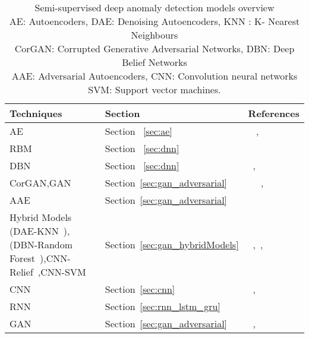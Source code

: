 \begin{table*}
\begin{center}
\caption{Semi-supervised deep anomaly detection models overview
        \\AE: Autoencoders, DAE: Denoising Autoencoders, KNN : K- Nearest Neighbours
        \\CorGAN: Corrupted Generative Adversarial Networks, DBN: Deep Belief Networks
        \\ AAE: Adversarial Autoencoders, CNN: Convolution neural networks
        \\ SVM:  Support vector machines.}
    \label{tab:semisupervisedModels}
    \begin{tabular}{ | p{4cm} | p{2cm} | p{4cm} |}
    \hline
     \textbf{Techniques}  & \textbf{Section} & \textbf{References} \\ \hline
     AE & Section ~\ref{sec:ae} & ~\cite{edmunds2017deep} ,~\cite{estiri2018semi}\\\hline
     RBM & Section ~\ref{sec:dnn} & ~\cite{jia2014novel} \\\hline
     DBN & Section ~\ref{sec:dnn} & ~\cite{wulsin2010semi},~\cite{wulsin2011modeling} \\\hline
     CorGAN,GAN & Section~\ref{sec:gan_adversarial} & ~\cite{gu2018semi} ~\cite{akcay2018ganomaly},~\cite{sabokrou2018adversarially}\\\hline
     AAE &Section~\ref{sec:gan_adversarial} & ~\cite{dimokranitou2017adversarial}\\\hline
     Hybrid Models (DAE-KNN~\cite{altman1992introduction}), (DBN-Random Forest~\cite{ho1995random}),CNN-Relief~\cite{kira1992feature},CNN-SVM~\cite{cortes1995support} & Section~\ref{sec:gan_hybridModels} & ~\cite{song2017hybrid},~\cite{shi2017semi},~\cite{zhu2018hybrid} \\\hline
     CNN & Section~\ref{sec:cnn} & ~\cite{racah2017extremeweather},~\cite{perera2018learning} \\ \hline
     RNN & Section~\ref{sec:rnn_lstm_gru} & ~\cite{wu2018semi} \\ \hline
     GAN & Section~\ref{sec:gan_adversarial} & ~\cite{kliger2018novelty},~\cite{gu2018semi} \\ \hline
    \end{tabular}
\end{center}
\end{table*}



